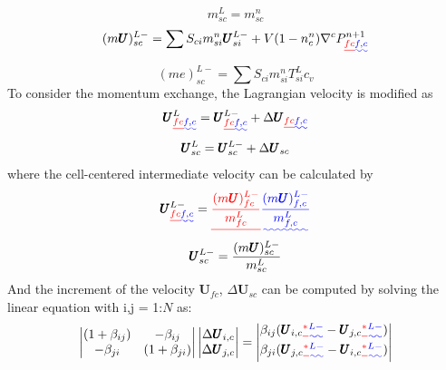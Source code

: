 \documentclass[preprint,12pt]{elsarticle}
\providecommand{\DIFadd}[1]{{\protect\color{blue}\uwave{#1}}} %
\providecommand{\DIFdel}[1]{{\protect\color{red}\sout{#1}}}                      %
\providecommand{\DIFaddbegin}{} %
\providecommand{\DIFaddend}{} %
\providecommand{\DIFdelbegin}{} %
\providecommand{\DIFdelend}{} %
\newcommand{\DIFscaledelfig}{0.5}
\newlength{\DIFdelgraphicswidth} %
\newlength{\DIFdelgraphicsheight} %
\newcommand{\DIFaddincludegraphics}[2][]{{\color{blue}\fbox{\DIFOincludegraphics[#1]{#2}}}} %
\newcommand{\DIFdelincludegraphics}[2][]{%
\sbox{\DIFdelgraphicsbox}{\DIFOincludegraphics[#1]{#2}}%
\settoboxwidth{\DIFdelgraphicswidth}{\DIFdelgraphicsbox} %
\settoboxtotalheight{\DIFdelgraphicsheight}{\DIFdelgraphicsbox} %
\scalebox{\DIFscaledelfig}{%
\parbox[b]{\DIFdelgraphicswidth}{\usebox{\DIFdelgraphicsbox}\\[-\baselineskip] \rule{\DIFdelgraphicswidth}{0em}}\llap{\resizebox{\DIFdelgraphicswidth}{\DIFdelgraphicsheight}{%
\setlength{\unitlength}{\DIFdelgraphicswidth}%
\begin{picture}(1,1)%
\thicklines\linethickness{2pt} %
{\color[rgb]{1,0,0}\put(0,0){\framebox(1,1){}}}%
{\color[rgb]{1,0,0}\put(0,0){\line( 1,1){1}}}%
{\color[rgb]{1,0,0}\put(0,1){\line(1,-1){1}}}%
\end{picture}%
}\hspace*{3pt}}} %
} %
\DeclareRobustCommand{\DIFaddbegin}{\DIFOaddbegin \let\includegraphics\DIFaddincludegraphics} %
\DeclareRobustCommand{\DIFaddend}{\DIFOaddend \let\includegraphics\DIFOincludegraphics} %
\DeclareRobustCommand{\DIFdelbegin}{\DIFOdelbegin \let\includegraphics\DIFdelincludegraphics} %
\DeclareRobustCommand{\DIFdelend}{\DIFOaddend \let\includegraphics\DIFOincludegraphics} %
\begin{document}
\begin{equation}
 m_{sc}^L = m_{sc}^n
\end {equation}
%
\begin{equation}
 (m \pmb{U})_{sc}^{L-} = \sum{S_{ci} m_{si}^n \pmb{U}_{si}^{L-}} + V (1-n_c^n) \nabla^c P_{\DIFdelbegin \DIFdel{fc}\DIFdelend \DIFaddbegin \DIFadd{f,c}\DIFaddend }^{n+1}
\end {equation}
%
\begin{equation}
 (me)_{sc}^{L-} =  \sum{S_{ci} m_{si}^n T_{si}^L} c_v
\end {equation}
%
%
To consider the momentum exchange, the Lagrangian velocity is modified as\DIFaddbegin \DIFadd{:
}\DIFaddend %
\begin{equation}
\begin{gathered}
\pmb{U}_{\DIFdelbegin \DIFdel{fc}\DIFdelend \DIFaddbegin \DIFadd{f,c}\DIFaddend }^{L} = \pmb{U}_{\DIFdelbegin \DIFdel{fc}\DIFdelend \DIFaddbegin \DIFadd{f,c}\DIFaddend }^{L-} + \Delta \pmb{U}_{\DIFdelbegin \DIFdel{fc}\DIFdelend \DIFaddbegin \DIFadd{f,c}\DIFaddend } \\
\pmb{U}_{sc}^{L} = \pmb{U}_{sc}^{L-} + \Delta \pmb{U}_{sc}
\end {gathered}
\end {equation}
%
%
where the cell-centered intermediate velocity can be calculated by\DIFaddbegin \DIFadd{:
}\DIFaddend %
\begin{equation}
\begin{gathered}
\pmb{U}_{\DIFdelbegin \DIFdel{fc}\DIFdelend \DIFaddbegin \DIFadd{f,c}\DIFaddend }^{L-} = \DIFdelbegin \DIFdel{\frac{(m \pmb{U})_{fc}^{L-}}{m_{fc}^L} }\DIFdelend \DIFaddbegin \DIFadd{\frac{(m \pmb{U})_{f,c}^{L-}}{m_{f,c}^L} }\DIFaddend \\
\pmb{U}_{sc}^{L-} = \frac{(m \pmb{U})_{sc}^{L-}}{m_{sc}^L} 
\end {gathered}
\end {equation}
%
%
And the increment of the velocity \DIFdelbegin \DIFdel{$\pmb{U}_{fc}$}\DIFdelend \DIFaddbegin \DIFadd{$\pmb{U}_{f,c}$}\DIFaddend , $\Delta \pmb{U}_{sc}$ can be computed by solving the linear equation with i,j = 1:$N$ as:
%
%
\[ \begin{vmatrix} (1 + \beta_{ij})  &  -\beta_{ij} \\
                  -\beta_{ji}       &  (1 + \beta_{ji})
    \end {vmatrix}
    \begin{vmatrix} \Delta \pmb{U}_{i,c} \\
                    \Delta \pmb{U}_{j,c}
    \end {vmatrix}
    =
    \begin{vmatrix}  \beta_{ij}(\pmb{U}_{i,c}\DIFdelbegin \DIFdel{^{*} }\DIFdelend \DIFaddbegin \DIFadd{^{L-} }\DIFaddend - \pmb{U}_{j,c}\DIFdelbegin \DIFdel{^{*}}\DIFdelend \DIFaddbegin \DIFadd{^{L-}}\DIFaddend ) \\
                    \beta_{ji}(\pmb{U}_{j,c}\DIFdelbegin \DIFdel{^{*} }\DIFdelend \DIFaddbegin \DIFadd{^{L-} }\DIFaddend - \pmb{U}_{i,c}\DIFdelbegin \DIFdel{^{*}}\DIFdelend \DIFaddbegin \DIFadd{^{L-}}\DIFaddend )
    \end {vmatrix}                
\]
\end{document}
